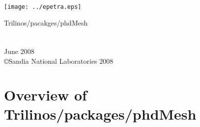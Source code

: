 \documentclass[letterpaper]{book}
\begin{document}
\begin{titlepage}
\texttt{[image: ../epetra.eps]}
\begin{center}
{\Huge Trilinos/pacakges/phdMesh \\[1ex]\large }\\
\vspace*{1cm}\\
\vspace*{0.5cm}
{\small June 2008}\\
\copyright Sandia National Laboratories 2008
\end{center}
\end{titlepage}
\clearemptydoublepage
{}
\tableofcontents
\clearemptydoublepage
{}
\chapter{Overview of Trilinos/packages/phdMesh}

\end{document}
